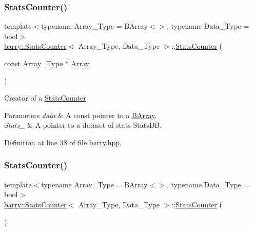 \subsubsection{\texorpdfstring{Stats\+Counter()}{StatsCounter()}\hspace{0.1cm}{\footnotesize\ttfamily [1/2]}}
{\footnotesize\ttfamily template$<$typename Array\+\_\+\+Type  = B\+Array$<$$>$, typename Data\+\_\+\+Type  = bool$>$ \\
\hyperlink{classbarry_1_1_stats_counter}{barry\+::\+Stats\+Counter}$<$ Array\+\_\+\+Type, Data\+\_\+\+Type $>$\+::\hyperlink{classbarry_1_1_stats_counter}{Stats\+Counter} (\begin{DoxyParamCaption}\item[{const Array\+\_\+\+Type $\ast$}]{Array\+\_\+ }\end{DoxyParamCaption})\hspace{0.3cm}{\ttfamily [inline]}}



Creator of a {\ttfamily \hyperlink{classbarry_1_1_stats_counter}{Stats\+Counter}} 


\begin{DoxyParams}{Parameters}
{\em data} & A const pointer to a {\ttfamily \hyperlink{classbarry_1_1_b_array}{B\+Array}}. \\
\hline
{\em Stats\+\_\+} & A pointer to a dataset of stats {\ttfamily Stats\+DB}. \\
\hline
\end{DoxyParams}


Definition at line 38 of file barry.\+hpp.

\mbox{\label{classbarry_1_1_stats_counter_a407df1580b207faac92c476c7062b840}} 
\subsubsection{\texorpdfstring{Stats\+Counter()}{StatsCounter()}\hspace{0.1cm}{\footnotesize\ttfamily [2/2]}}
{\footnotesize\ttfamily template$<$typename Array\+\_\+\+Type  = B\+Array$<$$>$, typename Data\+\_\+\+Type  = bool$>$ \\
\hyperlink{classbarry_1_1_stats_counter}{barry\+::\+Stats\+Counter}$<$ Array\+\_\+\+Type, Data\+\_\+\+Type $>$\+::\hyperlink{classbarry_1_1_stats_counter}{Stats\+Counter} (\begin{DoxyParamCaption}{ }\end{DoxyParamCaption})\hspace{0.3cm}{\ttfamily [inline]}}



